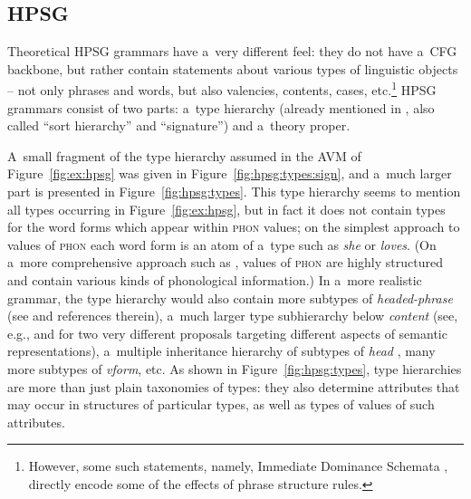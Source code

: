 \documentclass[output=paper,hidelinks]{langscibook}
\begin{document}
\subsection{HPSG}
\label{sec:gram:hpsg}

Theoretical HPSG grammars have a~very different feel: they do not have a~CFG backbone, but rather contain statements about various types of linguistic objects -- not only phrases and words, but also valencies, contents, cases, etc.\footnote{However, some such statements, namely, Immediate Dominance Schemata \citep[Section {1.5}]{pollard1994head-driven}, directly encode some of the effects of phrase structure rules.}  HPSG grammars consist of two parts: a~type hierarchy (already mentioned in , also called “sort hierarchy” and “signature”) and a~theory proper.  

A~small fragment of the type hierarchy assumed in the AVM of Figure~\ref{fig:ex:hpsg} was given in Figure~\ref{fig:hpsg:types:sign}, and a~much larger part is presented in Figure~\ref{fig:hpsg:types}. This type hierarchy seems to mention all types occurring in Figure~\ref{fig:ex:hpsg}, but in fact it does not contain types for the word forms which appear within \textsc{phon} values; on the simplest approach to values of \textsc{phon} each word form is an atom of a~type such as \textit{she} or \textit{loves}. (On a~more comprehensive approach such as \citealt{hoeh:98}, values of \textsc{phon} are highly structured and contain various kinds of phonological information.)  In a~more realistic grammar, the type hierarchy would also contain more subtypes of \textit{headed\hyp{}phrase} (see \citealt[Sections {\mbox{5--6}}]{abe:bor:20} and references therein), a~much larger type subhierarchy below \textit{content} (see, e.g., \citealt{ric:sai2:97c,ric:sai:98} and \citealt{davi:01} for two very different proposals targeting different aspects of semantic representations), a~multiple inheritance hierarchy of subtypes of \textit{head} \citep{malo:98a}, many more subtypes of \textit{vform}, etc.  As shown in Figure~\ref{fig:hpsg:types}, type hierarchies are more than just plain taxonomies of types: they also determine attributes that may occur in structures of particular types, as well as types of values of such attributes.
\end{document}
